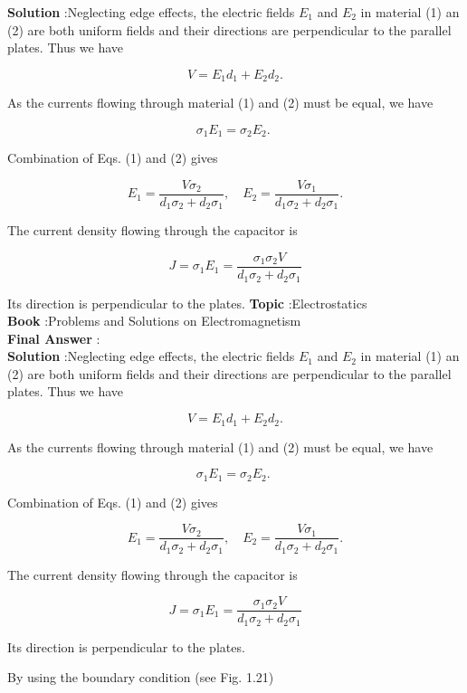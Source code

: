 \documentclass[10pt]{article}
\begin{document}
\textbf{Solution} :Neglecting edge effects, the electric fields $E_{1}$ and $E_{2}$ in material (1) an (2) are both uniform fields and their directions are perpendicular to the parallel plates. Thus we have

$$
V=E_{1} d_{1}+E_{2} d_{2} .
$$

As the currents flowing through material (1) and (2) must be equal, we have

$$
\sigma_{1} E_{1}=\sigma_{2} E_{2} \text {. }
$$

Combination of Eqs.
(1) and (2) gives

$$
E_{1}=\frac{V \sigma_{2}}{d_{1} \sigma_{2}+d_{2} \sigma_{1}}, \quad E_{2}=\frac{V \sigma_{1}}{d_{1} \sigma_{2}+d_{2} \sigma_{1}} .
$$

 The current density flowing through the capacitor is

$$
J=\sigma_{1} E_{1}=\frac{\sigma_{1} \sigma_{2} V}{d_{1} \sigma_{2}+d_{2} \sigma_{1}}
$$

Its direction is perpendicular to the plates.
\textbf{Topic} :Electrostatics\\
\textbf{Book} :Problems and Solutions on Electromagnetism\\
\textbf{Final Answer} :\\


\textbf{Solution} :Neglecting edge effects, the electric fields $E_{1}$ and $E_{2}$ in material (1) an (2) are both uniform fields and their directions are perpendicular to the parallel plates. Thus we have

$$
V=E_{1} d_{1}+E_{2} d_{2} .
$$

As the currents flowing through material (1) and (2) must be equal, we have

$$
\sigma_{1} E_{1}=\sigma_{2} E_{2} \text {. }
$$

Combination of Eqs.
(1) and (2) gives

$$
E_{1}=\frac{V \sigma_{2}}{d_{1} \sigma_{2}+d_{2} \sigma_{1}}, \quad E_{2}=\frac{V \sigma_{1}}{d_{1} \sigma_{2}+d_{2} \sigma_{1}} .
$$

 The current density flowing through the capacitor is

$$
J=\sigma_{1} E_{1}=\frac{\sigma_{1} \sigma_{2} V}{d_{1} \sigma_{2}+d_{2} \sigma_{1}}
$$

Its direction is perpendicular to the plates.

 By using the boundary condition (see Fig. 1.21)
\end{document}

